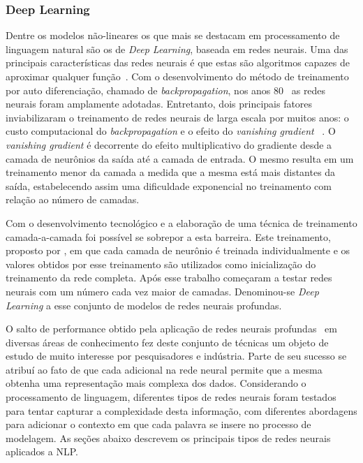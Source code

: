\subsubsection{Deep Learning}

Dentre os modelos não-lineares os que mais se destacam em processamento de
linguagem natural são os de \textit{Deep Learning}, baseada em redes neurais.
Uma das principais características das redes neurais é que estas são algoritmos
capazes de aproximar qualquer função~\cite{hornik89}.
Com o desenvolvimento do método de treinamento por auto diferenciação, chamado
de \textit{backpropagation}, nos anos 80~\cite{werbos82} as redes neurais
foram amplamente adotadas.
Entretanto, dois principais fatores inviabilizaram o treinamento de redes
neurais de larga escala por muitos anos: o custo computacional do
\textit{backpropagation} e o efeito do \textit{vanishing gradient}~
\cite{hochreiter98}.
O \textit{vanishing gradient} é decorrente do efeito multiplicativo do
gradiente desde a camada de neurônios da saída até a camada de entrada.
O mesmo resulta em um treinamento menor da camada a medida que a mesma está
mais distantes da saída, estabelecendo assim uma dificuldade exponencial no
treinamento com relação ao número de camadas.

Com o desenvolvimento tecnológico e a elaboração de uma técnica de treinamento
camada-a-camada foi possível se sobrepor a esta barreira.
Este treinamento, proposto por \citet{hinton06}, em que cada camada de neurônio
é treinada individualmente e os valores obtidos por esse treinamento são
utilizados como inicialização do treinamento da rede completa.
Após esse trabalho começaram a testar redes neurais com um número cada vez
maior de camadas.
Denominou-se \textit{Deep Learning} a esse conjunto de modelos de redes neurais
profundas.

O salto de performance obtido pela aplicação de redes neurais
profundas~\cite{lecun15} em diversas áreas de conhecimento fez deste conjunto de
técnicas um objeto de estudo de muito interesse por pesquisadores e indústria.
Parte de seu sucesso se atribuí ao fato de que cada adicional na rede neural
permite que a mesma obtenha uma representação mais complexa dos dados.
Considerando o processamento de linguagem, diferentes tipos de redes neurais
foram testados para tentar capturar a complexidade desta informação,
com diferentes abordagens para adicionar o contexto em que cada palavra se
insere no processo de modelagem.
As seções abaixo descrevem os principais tipos de redes neurais aplicados a NLP.

